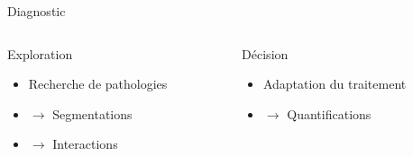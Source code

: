 \documentclass{beamer}
\begin{document}
\begin{frame}{Diagnostic}
  \begin{columns}[t]
 \begin{column}{0.5\textwidth}
 \begin{block}{Exploration}
  \begin{itemize}
   \item Recherche de pathologies
   \item $\rightarrow$ Segmentations
   \item $\rightarrow$ Interactions
  \end{itemize}
 \end{block}
 \end{column}
 \begin{column}{0.5\textwidth}
 \begin{block}{Décision}
  \begin{itemize}
   \item Adaptation du traitement
   \item $\rightarrow$ Quantifications
  \end{itemize}
 \end{block}
\end{column}
\end{columns}
\end{frame}
\end{document}

